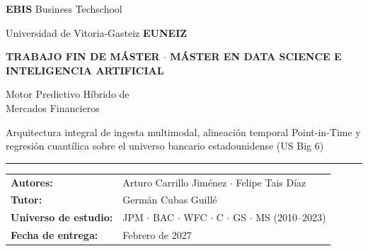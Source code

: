 \documentclass[11pt, a4paper]{report}
\begin{document}
\begin{titlepage}
    \sffamily
    \thispagestyle{empty}
    \noindent
    \begin{minipage}[t]{0.5\textwidth}
        \raggedright
        {\fontsize{13}{15}\selectfont\bfseries\color{NavyPrimary} EBIS} {\fontsize{10}{12}\selectfont\color{MutedGray} Business Techschool}
    \end{minipage}%
    \begin{minipage}[t]{0.5\textwidth}
        \raggedleft
        {\fontsize{9}{11}\selectfont\color{MutedGray} Universidad de Vitoria-Gasteiz} {\fontsize{13}{15}\selectfont\bfseries\color{NavyPrimary} EUNEIZ}
    \end{minipage}

    \vspace{2.8cm}

    {\fontsize{9.5}{12}\selectfont\bfseries\color{CyanAccent}
    TRABAJO FIN DE MÁSTER \quad $\cdot$ \quad MÁSTER EN DATA SCIENCE E INTELIGENCIA ARTIFICIAL}

    \vspace{0.5cm}

    {\fontsize{26}{32}\selectfont\bfseries\color{NavyPrimary}\raggedright
    Motor Predictivo Híbrido de\\Mercados Financieros\par}

    \vspace{0.4cm}

    {\fontsize{13}{18}\selectfont\color{MutedGray}
    Arquitectura integral de ingesta multimodal, alineación temporal Point-in-Time y regresión cuantílica sobre el universo bancario estadounidense (US Big 6)\par}

    \vspace{1.2cm}
    {\color{CyanAccent}\rule{3.5cm}{2pt}}
    \vspace{1.5cm}

    \begin{tabular}{!{\color{NavyPrimary}\vrule width 2.5pt}l l}
        \textbf{\color{NavyPrimary}Autores:} & Arturo Carrillo Jiménez $\cdot$ Felipe Tais Díaz \\[0.4em]
        \textbf{\color{NavyPrimary}Tutor:} & Germán Cubas Guillé \\[0.4em]
        \textbf{\color{NavyPrimary}Universo de estudio:} & JPM $\cdot$ BAC $\cdot$ WFC $\cdot$ C $\cdot$ GS $\cdot$ MS (2010--2023) \\[0.4em]
        \textbf{\color{NavyPrimary}Fecha de entrega:} & Febrero de 2027 \\
    \end{tabular}


\end{titlepage}
\end{document}

